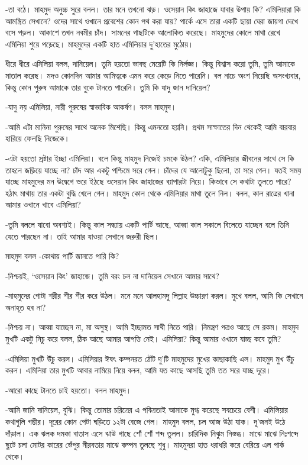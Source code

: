 \documentclass[
]{book}
\begin{document}
-তা বঠে। মাহমুদ অনুচ্চ সুরে বলল। তার মনে তখনো ঝড়। ওসেয়ান কিং জাহাজে যাবার উপায় কি? এমিলিয়ারা কি আমন্ত্রিত সেখানে? ওদের সাথে ওখানে প্রবেশের কোন পথ করা যায়? পার্কে এসে তারা একটি ছায়া ঘেরা জায়গা দেখে বসে পড়ল। আকাশে তখন নবমীর চাঁদ। সামনের গাছটিকে আলোকিত করেছে। মাহমুদের কোলে মাথা রেখে এমিলিয়া শুয়ে পড়েছে। মাহমুদের একটি হাত এমিলিয়ার দু'হাতের মুঠোয়।

ধীরে ধীরে এমিলিয়া বলল, দানিয়েল। তুমি হয়তো ভাবছ মেয়েটি কি নির্লজ্জ। কিন্তু বিশ্বাস করো তুমি, তুমি আমাকে মাতাল করেছ। মদও কোনদিন আমার আমিত্বকে এমন করে কেড়ে নিতে পারেনি। বল নাচে অংশ নিয়েছি অসংখ্যবার, কিন্তু কোন পুরুষ আমাকে তার বুকে টানতে পারেনি। তুমি কি যাদু জান দানিয়েল?

-যাদু নয় এমিলিয়া, নারী পুরুষের স্বাভাবিক আকর্ষণ। বলল মাহমুদ।

-আমি এটা মানিনা পুরুষের সাথে অনেক মিশেছি। কিন্তু এমনতো হয়নি। প্রথম সাক্ষাতের দিন থেকেই আমি বারবার হারিয়ে ফেলছি নিজেকে।

-এটা হয়তো স্রষ্টার ইচ্ছা এমিলিয়া। বলে কিন্তু মাহমুদ নিজেই চমকে উঠল? একি, এমিলিয়ার জীবনের সাথে সে কি তাহলে জড়িয়ে যাচ্ছে না? চাঁদ আর একটু পশ্চিমে সরে গেল। চাঁদের যে আলোটুকু ছিলো, তা সরে গেল। যতই সময় যাচ্ছে মাহমুদের মন উদ্বেগে ভরে ইঠছে ওসেয়ান কিং জাহাজের ব্যাপারটা নিয়ে। কিভাবে সে কথাটা তুলতে পারে? হঠাৎ মাথায় তার একটা বুদ্ধি খেলে গেল। মাহমুদ কোল থেকে এমিলিয়ার মাথা তুলে নিল। বলল, কাল রাত্রের খানা আমার ওখানে খাবে এমিলিয়া?

-তুমি বললে যাবো অবশ্যই। কিন্তু কাল সন্ধ্যায় একটি পার্টি আছে, আব্বা কাল সকালে বিলেতে যাচ্ছেন বলে তিনি যেতে পারছেন না। তাই আমার যাওয়া সেখানে জরুরী ছিল।

মাহমুদ বলল -কোথায় পার্টি জানতে পারি কি?

-নিশ্চয়ই, `ওসেয়ান কিং' জাহাজে। তুমি বরং চল না দানিয়েল সেখানে আমার সাথে?

-মাহমুদের গোটা শরীর শীর শীর করে উঠল। মনে মনে আলহামদু লিল্লাহ উচ্চারণ করল। মুখে বলল, আমি কি সেখানে অনাহূত হব না?

-নিশ্চয় না। আব্বা যাচ্ছেন না, মা অসুস্থ। আমি ইচ্ছামত সাথী নিতে পারি। নিমন্ত্রণ পত্রও আছে সে রকম। মাহমুদ মুখটি একটু নিচু করে বলল, ঠিক আছে আমার আপত্তি নেই। এমিলিয়া? কিন্তু আমার ওখানে যাচ্ছ কবে তুমি?

-এমিলিয়া মুখটি উঁচু করল। এমিলিয়ার ঈষৎ কম্পনরত ঠোঁট দু'টি মাহমুদের মুখের কাছাকাছি এল। মাহমুদ মুখ উঁচু করল। এমিলিয়া তার মুখটি আবার নামিয়ে নিয়ে বলল, আমি যত কাছে আসছি তুমি তত সরে যাচ্ছ দূরে।

-আরো কাছে টানতে চাই হয়তো। বলল মাহমুদ।

-আমি জানি দানিয়েল, বুঝি। কিন্তু তোমার চরিত্রের এ পবিত্রতাই আমাকে মুগ্ধ করেছে সবচেয়ে বেশী। এমিলিয়ার কথাগুলি গম্ভীর। দূরের কোন পেটা ঘড়িতে ১২টা বেজে গেল। মাহমুদ বলল, চল আজ উঠা যাক। দু'জনই উঠে দাঁড়াল। এক ঝলক দমকা বাতাস এসে ঝাউ গাছে শোঁ শোঁ শব্দ তুলল। চারিদিক নিঝুম নিস্তব্ধ। মাঝে মাঝে নিঃশব্দে ছুটে চলা মোটর কারের ভেঁপুর নীরবতার মাঝে কম্পন তুলছে শুধু। মাহমুদরা হাত ধরাধরি করে বেরিয়ে এল পার্ক থেকে।
\end{document}
